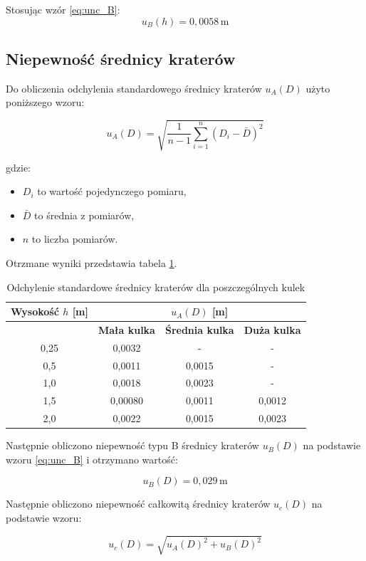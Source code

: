\documentclass[a4paper,12pt]{article}
\begin{document}
Stosując wzór \eqref{eq:unc_B}:
\[
u_B(h) = 0,0058 \, \text{m}
\]

\subsection{Niepewność średnicy kraterów}

Do obliczenia odchylenia standardowego średnicy kraterów $u_A(D)$ użyto poniższego wzoru:

\[
u_A(D) = \sqrt{\frac{1}{n-1} \sum_{i=1}^{n} (D_i - \bar{D})^2}
\]

gdzie:

\begin{itemize}
    \item \( D_i \) to wartość pojedynczego pomiaru,
    \item \( \bar{D} \) to średnia z pomiarów,
    \item \( n \) to liczba pomiarów.
\end{itemize}

Otrzmane wyniki przedstawia tabela \ref{tab:odchylenia_standardowe_srednicy}.

\begin{table}[H]
\centering
\begin{tabular}{|c|c|c|c|}
\hline
\textbf{Wysokość $h$ [m]} & \multicolumn{3}{c|}{\textbf{$u_A(D)$ [m]}} \\
\hline
& \textbf{Mała kulka} & \textbf{Średnia kulka} & \textbf{Duża kulka} \\
\hline
0,25 & 0,0032 & - & - \\
 \hline
 0,5  & 0,0011 & 0,0015 & - \\
 \hline
 1,0  & 0,0018 & 0,0023 & - \\
 \hline
 1,5  & 0,00080 & 0,0011 & 0,0012 \\
 \hline
 2,0  & 0,0022 & 0,0015 & 0,0023 \\
\hline
\end{tabular}
\caption{Odchylenie standardowe średnicy kraterów dla poszczególnych kulek}
\label{tab:odchylenia_standardowe_srednicy}
\end{table}

Następnie obliczono niepewność typu B średnicy kraterów $u_B(D)$ na podstawie wzoru \eqref{eq:unc_B} i otrzymano wartość: 

$$
u_B(D) = 0,029 \, \text{m}
$$

Następnie obliczono niepewność całkowitą średnicy kraterów $u_c(D)$ na podstawie wzoru:

\[
u_c(D) = \sqrt{u_A(D)^2 + u_B(D)^2}
\]
\end{document}
